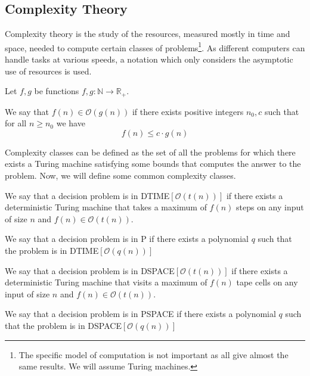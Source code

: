 \subsection{Complexity Theory}\label{subsec:complexity-theory}

Complexity theory is the study of the resources, measured mostly in time and space, needed to compute certain classes of problems\footnote{The specific model of computation is not important as all give almost the same results. We will assume Turing machines.}.
As different computers can handle tasks at various speeds, a notation which only considers the asymptotic use of resources is used.

\begin{define}
    Let $f, g$ be functions $f, g: \mathbb{N} \to \mathbb{R}_+$.

    We say that $f(n) \in \mathcal{O}(g(n))$ if there exists positive integers $n_0, c$ such that for all $n \geq n_0$ we have \[f(n) \leq c\cdot g(n)\]
\end{define}

Complexity classes can be defined as the set of all the problems for which there exists a Turing machine satisfying some bounds that computes the answer to the problem.
Now, we will define some common complexity classes.

\begin{define}
[{DTIME$[\mathcal{O}(t(n))]$}]
    We say that a decision problem is in DTIME$[\mathcal{O}(t(n))]$ if there exists a deterministic Turing machine that takes a maximum of $f(n)$ steps on any input of size $n$ and $f(n) \in \mathcal{O}(t(n))$.
\end{define}

\begin{define}[P]
    We say that a decision problem is in P if there exists a polynomial $q$ such that the problem is in DTIME$[\mathcal{O}(q(n))]$
\end{define}

\begin{define}
[{DSPACE$[\mathcal{O}(t(n))]$}]
    We say that a decision problem is in DSPACE$[\mathcal{O}(t(n))]$ if there exists a deterministic Turing machine that visits a maximum of $f(n)$ tape cells on any input of size $n$ and $f(n) \in \mathcal{O}(t(n))$.
\end{define}

\begin{define}[PSPACE]
    We say that a decision problem is in PSPACE if there exists a polynomial $q$ such that the problem is in DSPACE$[\mathcal{O}(q(n))]$
\end{define}

